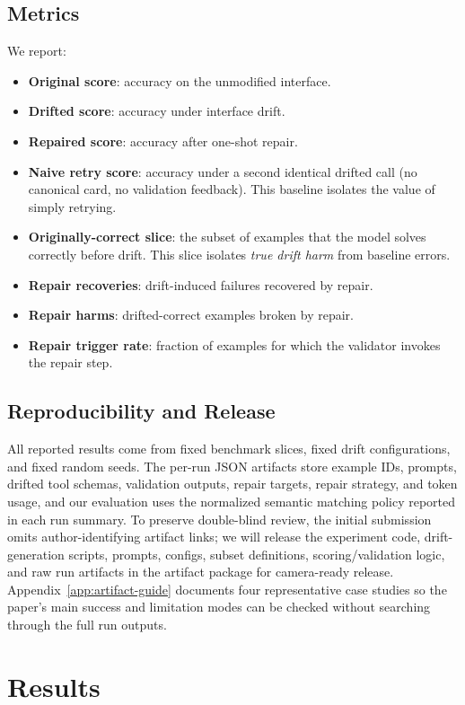 \documentclass{svproc}
\newcommand{\artifactrepolink}{artifact package for camera-ready release}
\begin{document}
\subsection{Metrics}
We report:
\begin{itemize}
\item \textbf{Original score}: accuracy on the unmodified interface.
\item \textbf{Drifted score}: accuracy under interface drift.
\item \textbf{Repaired score}: accuracy after one-shot repair.
\item \textbf{Naive retry score}: accuracy under a second identical drifted call
(no canonical card, no validation feedback). This baseline isolates the value of
simply retrying.
\item \textbf{Originally-correct slice}: the subset of examples that the model solves
correctly before drift. This slice isolates \emph{true drift harm} from baseline
errors.
\item \textbf{Repair recoveries}: drift-induced failures recovered by repair.
\item \textbf{Repair harms}: drifted-correct examples broken by repair.
\item \textbf{Repair trigger rate}: fraction of examples for which the validator
invokes the repair step.
\end{itemize}

\subsection{Reproducibility and Release}
All reported results come from fixed benchmark slices, fixed drift configurations,
and fixed random seeds. The per-run JSON artifacts store example IDs, prompts,
drifted tool schemas, validation outputs, repair targets, repair strategy, and
token usage, and our evaluation uses the normalized semantic matching policy
reported in each run summary. To preserve double-blind review, the initial
submission omits author-identifying artifact links; we will release the experiment
code, drift-generation scripts, prompts, configs, subset definitions,
scoring/validation logic, and raw run artifacts in the \artifactrepolink.
Appendix~\ref{app:artifact-guide} documents four representative case studies so
the paper's main success and limitation modes can be checked without searching
through the full run outputs.

\section{Results}
\end{document}

